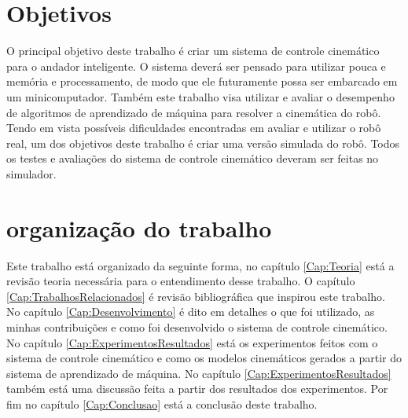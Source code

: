 \section{Objetivos}

O principal objetivo deste trabalho é criar um  sistema de
controle cinemático para o andador inteligente. O sistema deverá
ser pensado para utilizar pouca e memória e processamento, de modo
que ele futuramente possa ser embarcado em um minicomputador.
Também este trabalho visa utilizar e avaliar o desempenho de algoritmos
de aprendizado de máquina para resolver a cinemática do robô. Tendo em
vista possíveis dificuldades encontradas em avaliar e utilizar o robô real,
um dos objetivos deste trabalho é criar uma versão simulada do robô.
Todos os testes e avaliações do sistema de controle cinemático deveram
ser feitas no simulador.

\section{organização do trabalho}

Este trabalho está organizado da seguinte forma, no capítulo \ref{Cap:Teoria}
está a revisão teoria necessária para o entendimento desse trabalho. O capítulo
\ref{Cap:TrabalhosRelacionados} é revisão bibliográfica que inspirou este
trabalho. No capítulo \ref{Cap:Desenvolvimento} é dito em detalhes o que foi
utilizado, as minhas contribuições e
como foi desenvolvido o sistema de controle cinemático. No capítulo
\ref{Cap:ExperimentosResultados}
está os experimentos feitos com o sistema de controle cinemático
e como os modelos cinemáticos gerados a partir do sistema de aprendizado de
máquina.
No capítulo \ref{Cap:ExperimentosResultados} também está uma discussão feita
a partir dos resultados dos experimentos. Por fim  no capítulo \ref{Cap:Conclusao} está a conclusão deste
trabalho.
